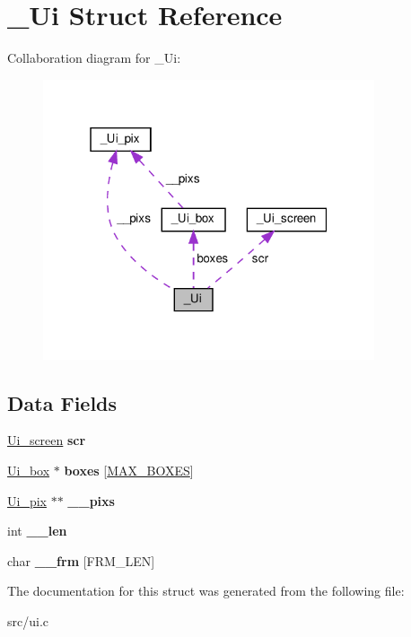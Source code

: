 \hypertarget{struct__Ui}{}\section{\+\_\+\+Ui Struct Reference}
\label{struct__Ui}


Collaboration diagram for \+\_\+\+Ui\+:\nopagebreak
\begin{figure}[H]
\begin{center}
\leavevmode
\includegraphics[width=277pt]{struct__Ui__coll__graph}
\end{center}
\end{figure}
\subsection*{Data Fields}
\begin{DoxyCompactItemize}
\item 
\mbox{\label{struct__Ui_abd7c2a78bbdbe0e91a47a1461660b747}} 
\hyperlink{struct__Ui__screen}{Ui\+\_\+screen} {\bfseries scr}
\item 
\mbox{\label{struct__Ui_a04ed2c273edd9ab846366eeaba66f097}} 
\hyperlink{struct__Ui__box}{Ui\+\_\+box} $\ast$ {\bfseries boxes} \mbox{[}\hyperlink{ui_8h_abe040ae255b70ffb201aacc407ed614d}{M\+A\+X\+\_\+\+B\+O\+X\+ES}\mbox{]}
\item 
\mbox{\label{struct__Ui_a11af896bffe4bdbeca5ca871f7a9b7f0}} 
\hyperlink{struct__Ui__pix}{Ui\+\_\+pix} $\ast$$\ast$ {\bfseries \+\_\+\+\_\+pixs}
\item 
\mbox{\label{struct__Ui_a368b423615ed2b6852c1ca99fd6351ce}} 
int {\bfseries \+\_\+\+\_\+len}
\item 
\mbox{\label{struct__Ui_a6fa9582f3825e06799573007e6cfe9e8}} 
char {\bfseries \+\_\+\+\_\+frm} \mbox{[}F\+R\+M\+\_\+\+L\+EN\mbox{]}
\end{DoxyCompactItemize}


The documentation for this struct was generated from the following file\+:\begin{DoxyCompactItemize}
\item 
src/ui.\+c\end{DoxyCompactItemize}
